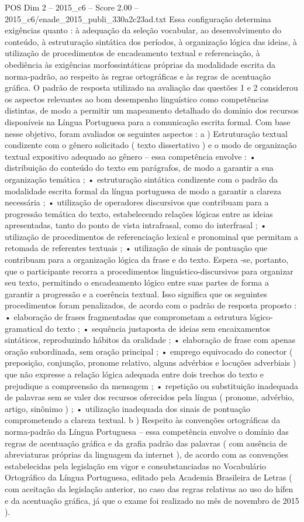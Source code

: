 \begin{textsample}{POS Dim 2 – 2015\_c6 – Score 2.00 – 2015\_c6/enade\_2015\_publi\_330a2c23ad.txt}
Essa configuração determina exigências quanto : à adequação da seleção vocabular, ao desenvolvimento do conteúdo, à estruturação sintática dos períodos, à organização lógica das ideias, à utilização de procedimentos de encadeamento textual e referenciação, à obediência às exigências morfossintáticas próprias da modalidade escrita da norma-padrão, ao respeito às regras ortográficas e às regras de acentuação gráfica.
O padrão de resposta utilizado na avaliação das questões 1 e 2 considerou os aspectos relevantes ao bom desempenho linguístico como competências distintas, de modo a permitir um mapeamento detalhado do domínio dos recursos disponíveis na Língua Portuguesa para a comunicação escrita formal.
Com base nesse objetivo, foram avaliados os seguintes aspectos : a ) Estruturação textual condizente com o gênero solicitado ( texto dissertativo ) e o modo de organização textual expositivo adequado ao gênero – essa competência envolve : • distribuição do conteúdo do texto em parágrafos, de modo a garantir a sua organização temática ; • estruturação sintática condizente com o padrão da modalidade escrita formal da língua portuguesa de modo a garantir a clareza necessária ; • utilização de operadores discursivos que contribuam para a progressão temática do texto, estabelecendo relações lógicas entre as ideias apresentadas, tanto do ponto de vista intrafrasal, como do interfrasal ; • utilização de procedimentos de referenciação lexical e pronominal que permitam a retomada de referentes textuais ; • utilização de sinais de pontuação que contribuam para a organização lógica da frase e do texto.
Espera -se, portanto, que o participante recorra a procedimentos linguístico-discursivos para organizar seu texto, permitindo o encadeamento lógico entre suas partes de forma a garantir a progressão e a coerência textual.
Isso significa que os seguintes procedimentos foram penalizados, de acordo com o padrão de resposta proposto : • elaboração de frases fragmentadas que comprometam a estrutura lógico-gramatical do texto ; • sequência justaposta de ideias sem encaixamentos sintáticos, reproduzindo hábitos da oralidade ; • elaboração de frase com apenas oração subordinada, sem oração principal ; • emprego equivocado do conector ( preposição, conjunção, pronome relativo, alguns advérbios e locuções adverbiais ) que não expresse a relação lógica adequada entre dois trechos do texto e prejudique a compreensão da mensagem ; • repetição ou substituição inadequada de palavras sem se valer dos recursos oferecidos pela língua ( pronome, advérbio, artigo, sinônimo ) ; • utilização inadequada dos sinais de pontuação comprometendo a clareza textual. b ) Respeito às convenções ortográficas da norma-padrão da Língua Portuguesa – essa competência envolve o domínio das regras de acentuação gráfica e da grafia padrão das palavras ( com ausência de abreviaturas próprias da linguagem da internet ), de acordo com as convenções estabelecidas pela legislação em vigor e consubstanciadas no Vocabulário Ortográfico da Língua Portuguesa, editado pela Academia Brasileira de Letras ( com aceitação da legislação anterior, no caso das regras relativas ao uso do hífen e da acentuação gráfica, já que o exame foi realizado no mês de novembro de 2015 ).

\end{textsample}
